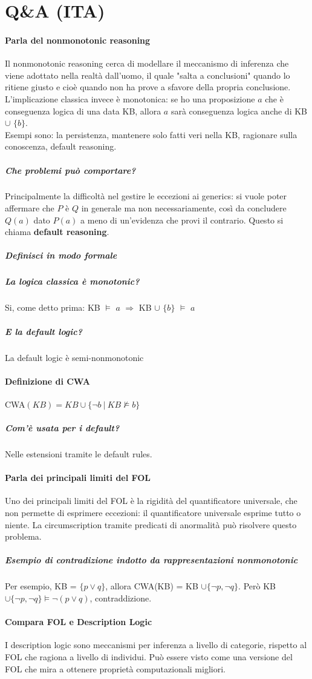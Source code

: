 \documentclass[10pt]{report}
\begin{document}
\section{Q\&A (ITA)}
\paragraph{Parla del nonmonotonic reasoning} Il nonmonotonic reasoning cerca di modellare il meccanismo di inferenza che viene adottato nella realtà dall'uomo, il quale "salta a conclusioni" quando lo ritiene giusto e cioè quando non ha prove a sfavore della propria conclusione. L'implicazione classica invece è monotonica: se ho una proposizione $a$ che è conseguenza logica di una data KB, allora $a$ sarà conseguenza logica anche di KB $\cup$ $\{b\}$.\\
Esempi sono: la persistenza, mantenere solo fatti veri nella KB, ragionare sulla conoscenza, default reasoning.
\subparagraph{Che problemi può comportare?} Principalmente la difficoltà nel gestire le eccezioni ai generics: si vuole poter affermare che $P$ è $Q$ in generale ma non necessariamente, così da concludere $Q(a)$ dato $P(a)$ a meno di un'evidenza che provi il contrario. Questo si chiama \textbf{default reasoning}.
\subparagraph{Definisci in modo formale}
\subparagraph{La logica classica è monotonic?} Si, come detto prima: KB $\vDash$ $a$ $\Rightarrow$ KB $\cup$ $\{b\}$ $\vDash$ $a$
\subparagraph{E la default logic?} La default logic è semi-nonmonotonic
\paragraph{Definizione di CWA} CWA$(KB) = KB \cup\{\neg b\:|\:KB\not\vDash b\}$
\subparagraph{Com'è usata per i default?} Nelle estensioni tramite le default rules.
\paragraph{Parla dei principali limiti del FOL} Uno dei principali limiti del FOL è la rigidità del quantificatore universale, che non permette di esprimere eccezioni: il quantificatore universale esprime tutto o niente. La circumscription tramite predicati di anormalità può risolvere questo problema.
\subparagraph{Esempio di contradizione indotto da rappresentazioni nonmonotonic} Per esempio, KB = $\{p\vee q\}$, allora CWA(KB) = KB $\cup\{\neg p, \neg q\}$. Però KB $\cup\{\neg p, \neg q\}\vDash \neg (p\vee q)$, contraddizione.
\paragraph{Compara FOL e Description Logic} I description logic sono meccanismi per inferenza a livello di categorie, rispetto al FOL che ragiona a livello di individui. Può essere visto come una versione del FOL che mira a ottenere proprietà computazionali migliori.
\end{document}
